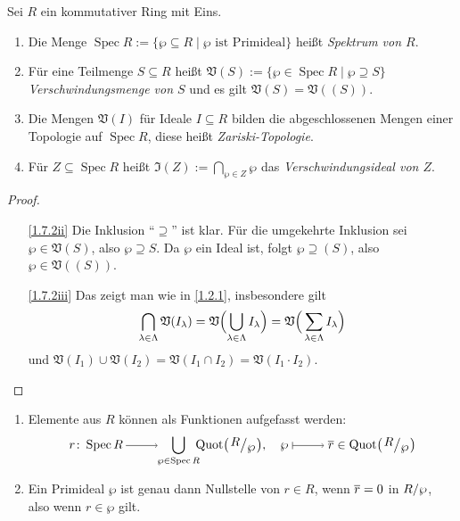 \documentclass[a4paper,12pt,index=toc]{scrbook}
\theoremstyle{keinenummern} %
\def\V{\mathfrak{V}}
\def\I{\mathfrak{I}}
\newcommand{\Spec}{\operatorname{Spec}}
\newcommand{\Quot}{\operatorname{Quot}}
\def\Bar#1{\ensuremath\overline{#1}}
\begin{document}
\begin{db}\label{1.7.2}
  Sei $R$ ein kommutativer Ring mit Eins.
  \begin{enumerate}
  \item{} Die Menge $\Spec R := \{\wp\subseteq R \mid \wp\text{ ist Primideal}\}$ heißt \emph{Spektrum von $R$}.
  \item{} Für eine Teilmenge $S\subseteq R$ heißt $\V(S) := \{\wp\in\Spec R \mid \wp\supseteq S\}$
    \emph{Verschwindungsmenge von $S$} und es gilt $\V(S)=\V((S))$.
  \item{} Die Mengen $\V(I)$ für Ideale $I\subseteq R$ bilden die abgeschlossenen Mengen einer Topologie auf
    $\Spec R$, diese heißt \emph{Zariski-Topologie}.
  \item{} Für $Z\subseteq\Spec R$ heißt $\I(Z):=\displaystyle\bigcap_{\wp\in Z}\wp$ das \emph{Verschwindungsideal von $Z$}.
  \end{enumerate}
\end{db}
\begin{proof}
  \begin{enumerate}
  \item[\ref{1.7.2ii}] Die Inklusion \enquote{$\supseteq$} ist klar. Für die umgekehrte Inklusion sei $\wp\in\V(S)$, also
    $\wp\supseteq S$. Da $\wp$ ein Ideal ist, folgt $\wp\supseteq (S)$, also $\wp\in\V((S))$.
  \item[\ref{1.7.2iii}] Das zeigt man wie in \cref{1.2.1}, insbesondere gilt
    \begin{equation*}\displaystyle\bigcap_{\lambda\in\Lambda}\V(I_\lambda) =
    \V\Bigl(\bigcup_{\lambda\in\Lambda}I_\lambda\Bigr)=\V\Bigr(\sum_{\lambda\in\Lambda}I_\lambda\Bigr)\end{equation*} und
    $\V(I_1)\cup\V(I_2)=\V(I_1\cap I_2)=\V(I_1\cdot I_2)$.
  \end{enumerate}
\end{proof}

\begin{db}\label{1.7.3}
  \begin{enumerate}
  \item{} Elemente aus $R$ können als Funktionen aufgefasst werden:
    \begin{equation*} r\colon \Spec R \ra \!\!\!\bigcup_{\wp\in\Spec R}\!\!\! \Quot\bigl(\Quotient{R}{\wp}\bigr),\quad
    \wp\mapsto\Bar{r}\in\Quot\bigl(\Quotient{R}{\wp}\bigr) \end{equation*}
  \item{} Ein Primideal $\wp$ ist genau dann Nullstelle von $r\in R$, wenn $\Bar{r}=0$ in $\Quotient{R}{\wp}$, also wenn
    $r\in \wp$ gilt.
  \end{enumerate}
\end{db}
\end{document}
